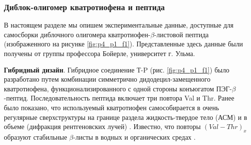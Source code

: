 \subsubsection{Диблок-олигомер кватротиофена и пептида}

    В настоящем разделе мы опишем экспериментальные данные, доступные для самосборки диблочного олигомера кватротиофен-$\beta$-листовой пептида (изображенного на рисунке \ref{fig:p4_p1_f1}). Представленные здесь данные были получены от группы профессора Бойерле, университет г. Ульма.

    \textbf{Гибридный дизайн}. Гибридное соединение Т-P (рис. \ref{fig:p4_p1_f1}) было разработано путем комбинации симметрично дидодецил-замещенного кватротиофена, функционализированного с одной стороны конъюгатом ПЭГ-$\beta$-пептид. Последовательность пептида включает три повтора Val и Thr. Ранее было показано, что используемый кватротиофен самособирается в очень регулярные сверхструктуры на границе раздела жидкость-твердое тело (АСМ) и в объеме (дифракция рентгеновских лучей) \cite{azumi_coincidence_2000,bauerle_oligothiophenes_1995,mena-osteritz_superstructures_2002}. Известно, что повторы $(Val-Thr)_x$ образуют стабильные $\beta$-листы в водных и органических средах \cite{janek_water-soluble_1999,hentschel_switch-peptides_2006,hentschel_peptide-directed_2006}.
    
